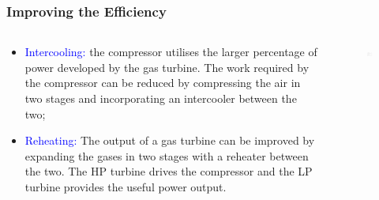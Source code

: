 \documentclass[10pt,compress]{beamer}
\begin{document}
\begin{frame}
 \frametitle{Improving the Efficiency}
 \begin{columns}
  \begin{column}[c]{0.5\linewidth} 
 \begin{itemize}
  \item <1-> \textcolor{blue}{Intercooling:} the compressor utilises the larger percentage of power developed by the gas turbine. The work required by the compressor can be reduced by compressing the air in two stages and incorporating an intercooler between the two; 
  \item <2-> \textcolor{blue}{Reheating:} The output of a gas turbine can be improved by expanding the gases in two stages with a reheater between the two. The HP turbine drives the compressor and the LP turbine provides the useful power output. 
 \end{itemize}
  \end{column}
  \begin{column}[c]{0.5\linewidth}
    \begin{center}
   \begin{figure}%
     \includegraphics[height=6.cm,width=6.5cm,clip]{./Pics/Brayton_cycle7}
   \end{figure}  
    \end{center}
  \end{column}  
 \end{columns}
\end{frame}
\end{document}

